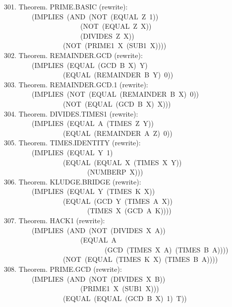 \documentclass[10pt]{book}
\newenvironment{pubasis}{\begin{flushleft}}{\end{flushleft}}
\begin{document}
\begin{pubasis}
301.    Theorem.  PRIME.BASIC (rewrite):\\
~~~~~~~~(IMPLIES~(AND~(NOT~(EQUAL~Z~1))\\
~~~~~~~~~~~~~~~~~~~~~~(NOT~(EQUAL~Z~X))\\
~~~~~~~~~~~~~~~~~~~~~~(DIVIDES~Z~X))\\
~~~~~~~~~~~~~~~~~(NOT~(PRIME1~X~(SUB1~X))))\\

302.    Theorem.  REMAINDER.GCD (rewrite):\\
~~~~~~~~(IMPLIES~(EQUAL~(GCD~B~X)~Y)\\
~~~~~~~~~~~~~~~~~(EQUAL~(REMAINDER~B~Y)~0))\\

303.    Theorem.  REMAINDER.GCD.1 (rewrite):\\
~~~~~~~~(IMPLIES~(NOT~(EQUAL~(REMAINDER~B~X)~0))\\
~~~~~~~~~~~~~~~~~(NOT~(EQUAL~(GCD~B~X)~X)))\\

304.    Theorem.  DIVIDES.TIMES1 (rewrite):\\
~~~~~~~~(IMPLIES~(EQUAL~A~(TIMES~Z~Y))\\
~~~~~~~~~~~~~~~~~(EQUAL~(REMAINDER~A~Z)~0))\\

305.    Theorem.  TIMES.IDENTITY (rewrite):\\
~~~~~~~~(IMPLIES~(EQUAL~Y~1)\\
~~~~~~~~~~~~~~~~~(EQUAL~(EQUAL~X~(TIMES~X~Y))\\
~~~~~~~~~~~~~~~~~~~~~~~~(NUMBERP~X)))\\

306.    Theorem.  KLUDGE.BRIDGE (rewrite):\\
~~~~~~~~(IMPLIES~(EQUAL~Y~(TIMES~K~X))\\
~~~~~~~~~~~~~~~~~(EQUAL~(GCD~Y~(TIMES~A~X))\\
~~~~~~~~~~~~~~~~~~~~~~~~(TIMES~X~(GCD~A~K))))\\

307.    Theorem.  HACK1 (rewrite):\\
~~~~~~~~(IMPLIES~(AND~(NOT~(DIVIDES~X~A))\\
~~~~~~~~~~~~~~~~~~~~~~(EQUAL~A\\
~~~~~~~~~~~~~~~~~~~~~~~~~~~~~(GCD~(TIMES~X~A)~(TIMES~B~A))))\\
~~~~~~~~~~~~~~~~~(NOT~(EQUAL~(TIMES~K~X)~(TIMES~B~A))))\\

308.    Theorem.  PRIME.GCD (rewrite):\\
~~~~~~~~(IMPLIES~(AND~(NOT~(DIVIDES~X~B))\\
~~~~~~~~~~~~~~~~~~~~~~(PRIME1~X~(SUB1~X)))\\
~~~~~~~~~~~~~~~~~(EQUAL~(EQUAL~(GCD~B~X)~1)~T))\\


\end{pubasis}
\end{document}
